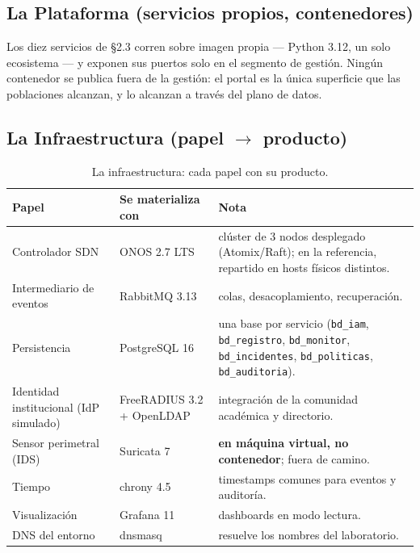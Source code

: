 \documentclass[11pt,a4paper]{report}
\begin{document}
\subsection{La Plataforma (servicios propios, contenedores)}
Los diez servicios de §2.3 corren sobre imagen propia — Python 3.12, un solo ecosistema — y exponen sus puertos solo en el segmento de gestión. Ningún contenedor se publica fuera de la gestión: el portal es la única superficie que las poblaciones alcanzan, y lo alcanzan a través del plano de datos.

\subsection{La Infraestructura (papel $\rightarrow$ producto)}
\begin{table}[h!]
\centering
\small
\begin{tabularx}{\linewidth}{p{3.6cm}p{3.2cm}X}
\toprule
\textbf{Papel} & \textbf{Se materializa con} & \textbf{Nota} \\
\midrule
Controlador SDN & ONOS 2.7 LTS & clúster de 3 nodos desplegado (Atomix/Raft); en la referencia, repartido en hosts físicos distintos. \\
Intermediario de eventos & RabbitMQ 3.13 & colas, desacoplamiento, recuperación. \\
Persistencia & PostgreSQL 16 & una base por servicio (\texttt{bd\_iam}, \texttt{bd\_registro}, \texttt{bd\_monitor}, \texttt{bd\_incidentes}, \texttt{bd\_politicas}, \texttt{bd\_auditoria}). \\
Identidad institucional (IdP simulado) & FreeRADIUS 3.2 + OpenLDAP & integración de la comunidad académica y directorio. \\
Sensor perimetral (IDS) & Suricata 7 & \textbf{en máquina virtual, no contenedor}; fuera de camino. \\
Tiempo & chrony 4.5 & timestamps comunes para eventos y auditoría. \\
Visualización & Grafana 11 & dashboards en modo lectura. \\
DNS del entorno & dnsmasq & resuelve los nombres del laboratorio. \\
\bottomrule
\end{tabularx}
\caption{La infraestructura: cada papel con su producto.}
\end{table}
\end{document}

